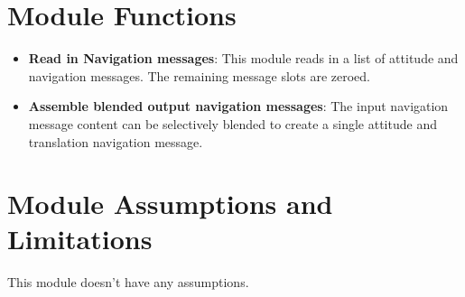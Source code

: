 

\section{Module Functions}
\begin{itemize}
	\item \textbf{Read in Navigation messages}: This module reads in a list of attitude and navigation messages.  The remaining message slots are zeroed.
	\item \textbf{Assemble blended output navigation messages}: The input navigation message content can be selectively blended to create a single attitude and translation navigation message. 
\end{itemize}

\section{Module Assumptions and Limitations}
This module doesn't have any assumptions.  